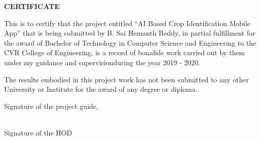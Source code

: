 \begin{center}
    \textbf{CERTIFICATE}
\end{center}

\setlength{\leftskip}{1.2cm}
This is to certify that the project entitled “AI Based Crop Identification Mobile App” 
that is being submitted by B. Sai Hemanth Reddy, \MakeUppercase{\rollNo} in partial fulfillment for 
the award of Bachelor of Technology in Computer Science and  Engineering to the 
CVR College of Engineering, is a record of bonafide work carried out by them under my 
guidance and supervisionduring the year 2019 - 2020.

\vspace{\baselineskip}

\setlength{\leftskip}{1.2cm}
The results embodied in this project work has not been submitted to any other University 
or Institute for the award of any degree or diploma.

\vspace{\baselineskip}\vspace{\baselineskip}

\setlength{\leftskip}{0pt}
\begin{minipage}[t]{.5\textwidth}
    \raggedright
    Signature of the project guide, \\
    \guideName{} \\
    \guideDesignation
\end{minipage}%
\begin{minipage}[t]{.5\textwidth}
    \raggedleft
    Signature of the HOD \\
    \hodName
\end{minipage}